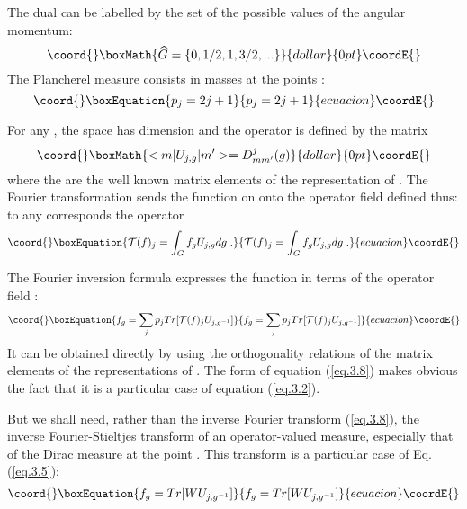 \documentclass[a4paper,11pt]{article}
\begin{document}
The dual can be labelled by the set of the possible values of the angular momentum:
$$\coord{}\boxMath{
  \Gc  = \{0,1/2,1,3/2,...\}
}{dollar}{0pt}\coordE{}$$
The Plancherel measure consists in masses \coordHE{} at the points \coordHE{}:
\begin{equation}\coord{}\boxEquation{
 \label{eq.3.6}
  p_j = 2j+1
}{
 p_j = 2j+1
}{ecuacion}\coordE{}\end{equation}

For any \coordHE{} , the space \coordHE{} has dimension \coordHE{} and the operator \coordHE{} is 
defined by the matrix 
$$\coord{}\boxMath{
    <m|U_{j,g}|m'> = D^j_{mm'}(g)
}{dollar}{0pt}\coordE{}$$
where the \coordHE{} are the well known matrix elements of the \coordHE{} representation of \coordHE{}. 
The 
Fourier transformation sends the function \coordHE{} on \coordHE{} onto the operator field defined thus: to 
any \coordHE{} corresponds the operator
\begin{equation}\coord{}\boxEquation{
 \label{eq.3.7}
  \mathcal{T}(f)_j = \int_G f_g U_{j,g} dg \;.
}{
 \mathcal{T}(f)_j = \int_G f_g U_{j,g} dg \;.
}{ecuacion}\coordE{}\end{equation}

The Fourier inversion formula expresses the function \coordHE{} in terms of the operator field 
\coordHE{}:
\begin{equation}\coord{}\boxEquation{
 \label{eq.3.8}
   f_g = \sum_j p_j Tr[\mathcal{T}(f)_j U_{j,g^{-1}} ]
}{
 f_g = \sum_j p_j Tr[\mathcal{T}(f)_j U_{j,g^{-1}} ]
}{ecuacion}\coordE{}\end{equation}
It can be obtained directly by using the orthogonality relations of the matrix elements of the 
representations of \coordHE{}. The form of equation (\ref{eq.3.8}) makes obvious the fact that it 
is a particular case of equation (\ref{eq.3.2}). 

But we shall need, rather than the inverse Fourier transform (\ref{eq.3.8}), the inverse 
Fourier-Stieltjes transform of an operator-valued measure, especially that of the Dirac measure 
\coordHE{} at the point \coordHE{}. This transform is a particular case of Eq. (\ref{eq.3.5}): 
\begin{equation}\coord{}\boxEquation{
 \label{eq.3.9}
  f_g = Tr[W U_{j,g^{-1}} ]
}{
 f_g = Tr[W U_{j,g^{-1}} ]
}{ecuacion}\coordE{}\end{equation}
\end{document}

